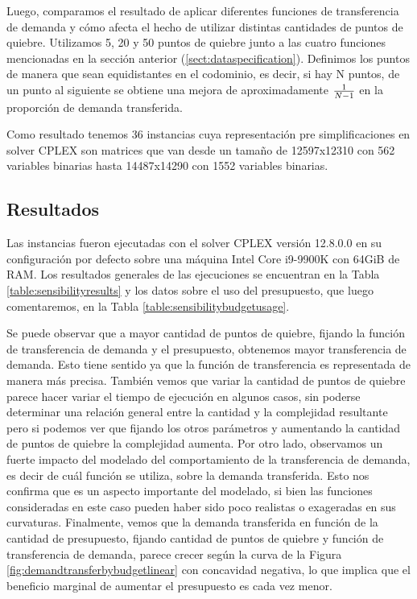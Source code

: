 Luego, comparamos el resultado de aplicar diferentes funciones de transferencia de demanda y cómo afecta el hecho de utilizar distintas cantidades de puntos de quiebre. Utilizamos 5, 20 y 50 puntos de quiebre junto a las cuatro funciones mencionadas en la sección anterior (\ref{sect:dataspecification}). Definimos los puntos de manera que sean equidistantes en el codominio, es decir, si hay N puntos, de un punto al siguiente se obtiene una mejora de aproximadamente ${1 \over N - 1}$ en la proporción de demanda transferida.

Como resultado tenemos 36 instancias cuya representación pre simplificaciones en solver CPLEX son matrices que van desde un tamaño de 12597x12310 con 562 variables binarias hasta 14487x14290 con 1552 variables binarias.

\FloatBarrier
\subsection{Resultados}

Las instancias fueron ejecutadas con el solver CPLEX versión 12.8.0.0 en su configuración por defecto sobre una máquina Intel Core i9-9900K con 64GiB de RAM. Los resultados generales de las ejecuciones se encuentran en la Tabla \ref{table:sensibilityresults} y los datos sobre el uso del presupuesto, que luego comentaremos, en la Tabla \ref{table:sensibilitybudgetusage}.

Se puede observar que a mayor cantidad de puntos de quiebre, fijando la función de transferencia de demanda y el presupuesto, obtenemos mayor transferencia de demanda. Esto tiene sentido ya que la función de transferencia es representada de manera más precisa. También vemos que variar la cantidad de puntos de quiebre parece hacer variar el tiempo de ejecución en algunos casos, sin poderse determinar una relación general entre la cantidad y la complejidad resultante pero si podemos ver que fijando los otros parámetros y aumentando la cantidad de puntos de quiebre la complejidad aumenta. Por otro lado, observamos un fuerte impacto del modelado del comportamiento de la transferencia de demanda, es decir de cuál función se utiliza, sobre la demanda transferida. Esto nos confirma que es un aspecto importante del modelado, si bien las funciones consideradas en este caso pueden haber sido poco realistas o exageradas en sus curvaturas. Finalmente, vemos que la demanda transferida en función de la cantidad de presupuesto, fijando cantidad de puntos de quiebre y función de transferencia de demanda, parece crecer según la curva de la Figura \ref{fig:demandtransferbybudgetlinear} con concavidad negativa, lo que implica que el beneficio marginal de aumentar el presupuesto es cada vez menor.

